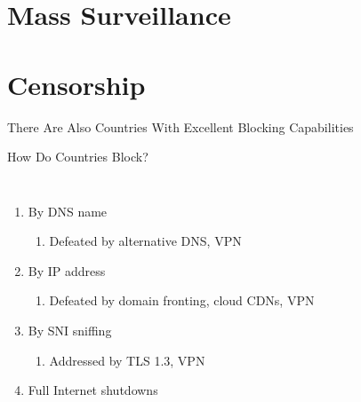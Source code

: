 \documentclass[nobackground,dvipsnames,table]{beamer}
\begin{document}
\section{Mass Surveillance}

\begin{frame}{}
\end{frame}

\begin{frame}{}
\end{frame}

\begin{frame}{}
\end{frame}

\begin{frame}{}
\end{frame}

\section{Censorship}

\begin{frame}{There Are Also Countries With Excellent Blocking Capabilities}
\end{frame}

\begin{frame}{How Do Countries Block?}
    \begin{columns}
            \begin{enumerate}
                \item By DNS name
                \begin{enumerate}
                    \item Defeated by alternative DNS, VPN
                \end{enumerate}
        
                \item By IP address
                \begin{enumerate}
                    \item Defeated by domain fronting, cloud CDNs, VPN
                \end{enumerate}
        
                \item By SNI sniffing
                \begin{enumerate}
                    \item Addressed by TLS 1.3, VPN
                \end{enumerate}
        
                \item Full Internet shutdowns
            \end{enumerate}
    \end{columns}
\end{frame}
\end{document}
